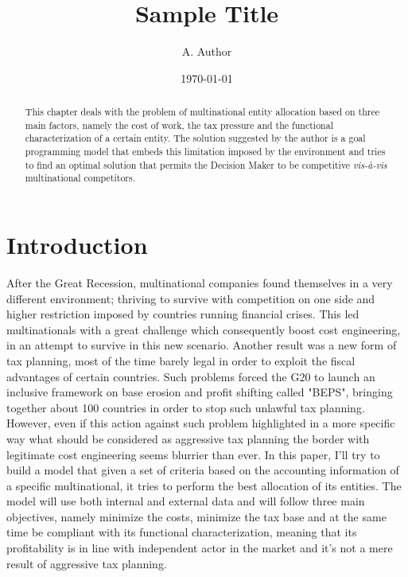 \documentclass{article}
\begin{document}
\title{Sample Title}

\author{A. Author}

\date{\today}

\maketitle

\begin{abstract}
This chapter deals with the problem of multinational entity allocation based on three main factors, namely the cost of work, the
tax pressure and the functional characterization of a certain entity. The solution suggested by the author is a goal programming model that embeds this limitation imposed by the environment and tries to find an optimal solution that permits the Decision Maker to be competitive \textit{vis-à-vis} multinational competitors.
\end{abstract}

\section{Introduction}
After the Great Recession, multinational companies found themselves in a very different environment; thriving to survive with competition on one side and higher restriction imposed by countries running financial crises. This led multinationals with a great challenge which consequently boost cost engineering, in an attempt to survive in this new scenario. Another result was a new form of tax planning, most of the time barely legal in order to exploit the fiscal advantages of certain countries\cite{_after_tax_hedging_report.pdf_????}. Such problems forced the G20 to launch an inclusive framework on base erosion and profit shifting called "BEPS", bringing together about 100 countries in order to stop such unlawful tax planning. However, even if this action against such problem highlighted in a more specific way what should be considered as aggressive tax planning the border with legitimate cost engineering seems blurrier than ever\cite{feller_three_2017}.
In this paper, I'll try to build a model that given a set of criteria based on the accounting information of a specific multinational, it tries to perform the best allocation of its entities. The model will use both internal and external data and will follow three main objectives, namely minimize the costs, minimize the tax base and at the same time be compliant with its functional characterization, meaning that its profitability is in line with independent actor in the market \cite{_model_2015} and it's not a mere result of aggressive tax planning.
\end{document}
